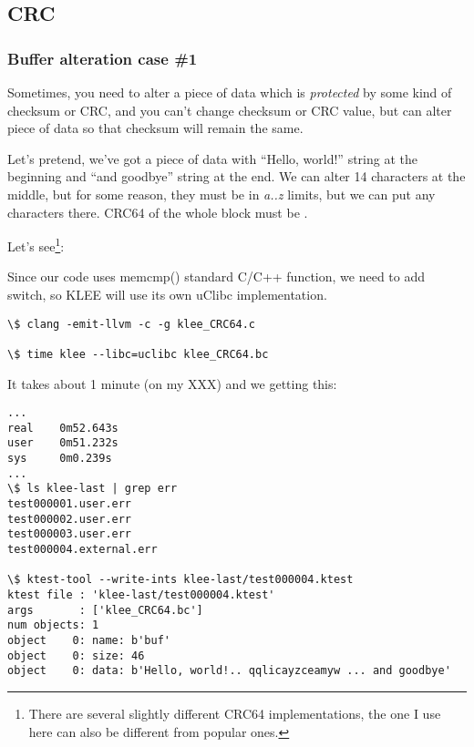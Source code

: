 \subsection{CRC} %

\subsubsection{Buffer alteration case \#1}

Sometimes, you need to alter a piece of data which is \textit{protected} by some kind of checksum or \ac{CRC}, and you can't change checksum or CRC value, but can alter piece of data so that checksum will remain the same.

Let's pretend, we've got a piece of data with ``Hello, world!'' string at the beginning and ``and goodbye'' string at the end.
We can alter 14 characters at the middle, but for some reason, they must be in \textit{a..z} limits, but we can put any characters there.
CRC64 of the whole block must be .

Let's see\footnote{There are several slightly different CRC64 implementations, the one I use here can also be different from popular ones.}:



Since our code uses memcmp() standard C/C++ function, we need to add  switch, so KLEE will use its own uClibc %
implementation. %

\begin{lstlisting}
\$ clang -emit-llvm -c -g klee_CRC64.c

\$ time klee --libc=uclibc klee_CRC64.bc
\end{lstlisting}

It takes about 1 minute (on my XXX) and we getting this:

\begin{lstlisting}
...
real    0m52.643s
user    0m51.232s
sys     0m0.239s
...
\$ ls klee-last | grep err
test000001.user.err
test000002.user.err
test000003.user.err
test000004.external.err

\$ ktest-tool --write-ints klee-last/test000004.ktest
ktest file : 'klee-last/test000004.ktest'
args       : ['klee_CRC64.bc']
num objects: 1
object    0: name: b'buf'
object    0: size: 46
object    0: data: b'Hello, world!.. qqlicayzceamyw ... and goodbye'
\end{lstlisting}

